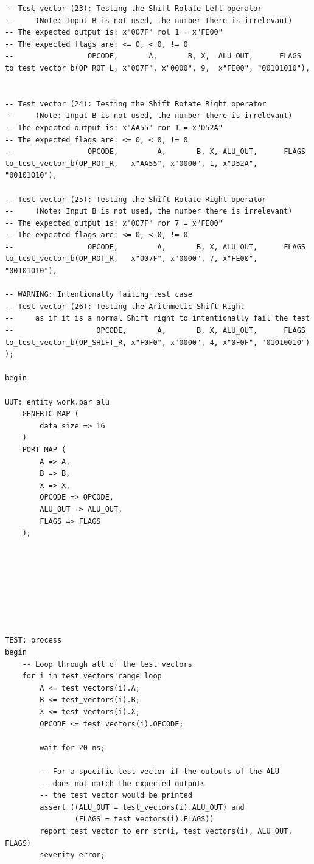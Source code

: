 \documentclass[10pt]{article}
\begin{document}
\begin{verbatim}
-- Test vector (23): Testing the Shift Rotate Left operator
--     (Note: Input B is not used, the number there is irrelevant)
-- The expected output is: x"007F" rol 1 = x"FE00"
-- The expected flags are: <= 0, < 0, != 0
--                 OPCODE,       A,       B, X,  ALU_OUT,      FLAGS
to_test_vector_b(OP_ROT_L, x"007F", x"0000", 9,  x"FE00", "00101010"),


-- Test vector (24): Testing the Shift Rotate Right operator 
--     (Note: Input B is not used, the number there is irrelevant)     
-- The expected output is: x"AA55" ror 1 = x"D52A"  
-- The expected flags are: <= 0, < 0, != 0
--                 OPCODE,         A,       B, X, ALU_OUT,      FLAGS
to_test_vector_b(OP_ROT_R,   x"AA55", x"0000", 1, x"D52A", "00101010"),

-- Test vector (25): Testing the Shift Rotate Right operator 
--     (Note: Input B is not used, the number there is irrelevant)     
-- The expected output is: x"007F" ror 7 = x"FE00"  
-- The expected flags are: <= 0, < 0, != 0
--                 OPCODE,         A,       B, X, ALU_OUT,      FLAGS
to_test_vector_b(OP_ROT_R,   x"007F", x"0000", 7, x"FE00", "00101010"),

-- WARNING: Intentionally failing test case
-- Test vector (26): Testing the Arithmetic Shift Right 
--     as if it is a normal Shift right to intentionally fail the test 
--                   OPCODE,       A,       B, X, ALU_OUT,      FLAGS    
to_test_vector_b(OP_SHIFT_R, x"F0F0", x"0000", 4, x"0F0F", "01010010")
);

begin

UUT: entity work.par_alu
    GENERIC MAP (
        data_size => 16
    )
    PORT MAP (
        A => A,
        B => B,
        X => X,
        OPCODE => OPCODE,
        ALU_OUT => ALU_OUT,
        FLAGS => FLAGS
    ); 
    
    






TEST: process
begin
    -- Loop through all of the test vectors
    for i in test_vectors'range loop
        A <= test_vectors(i).A;
        B <= test_vectors(i).B;
        X <= test_vectors(i).X;
        OPCODE <= test_vectors(i).OPCODE;
        
        wait for 20 ns;
        
        -- For a specific test vector if the outputs of the ALU
        -- does not match the expected outputs 
        -- the test vector would be printed
        assert ((ALU_OUT = test_vectors(i).ALU_OUT) and 
                (FLAGS = test_vectors(i).FLAGS))
        report test_vector_to_err_str(i, test_vectors(i), ALU_OUT, FLAGS)
        severity error;
        

\end{verbatim}
\end{document}
